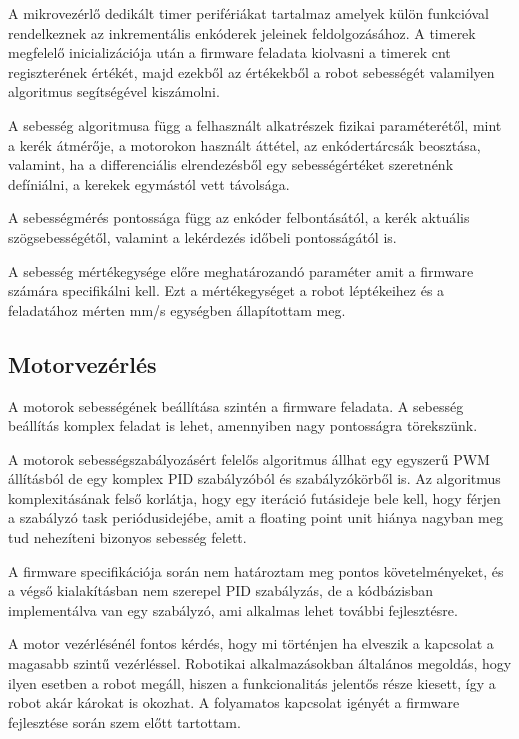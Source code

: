 A mikrovezérlő dedikált timer perifériákat tartalmaz amelyek külön funkcióval
rendelkeznek az inkrementális enkóderek jeleinek feldolgozásához. A timerek
megfelelő inicializációja után a firmware feladata kiolvasni a timerek cnt
regiszterének értékét, majd ezekből az értékekből a robot sebességét valamilyen
algoritmus segítségével kiszámolni.

A sebesség algoritmusa függ a felhasznált alkatrészek fizikai paraméterétől, mint
a kerék átmérője, a motorokon használt áttétel, az enkódertárcsák beosztása,
valamint, ha a differenciális elrendezésből egy sebességértéket szeretnénk
defíniálni, a kerekek egymástól vett távolsága.

A sebességmérés pontossága függ az enkóder felbontásától, a kerék aktuális
szögsebességétől, valamint a lekérdezés időbeli pontosságától is.

A sebesség mértékegysége előre meghatározandó paraméter amit a firmware számára
specifikálni kell. Ezt a mértékegységet a robot léptékeihez és a feladatához
mérten mm/s egységben állapítottam meg.

\subsection{Motorvezérlés}

A motorok sebességének beállítása szintén a firmware feladata. A sebesség
beállítás komplex feladat is lehet, amennyiben nagy pontosságra törekszünk.

A motorok sebességszabályozásért felelős algoritmus állhat egy egyszerű PWM
állításból de egy komplex PID szabályzóból és szabályzókörből is. Az algoritmus
komplexitásának felső korlátja, hogy egy iteráció futásideje bele kell, hogy
férjen a szabályzó task periódusidejébe, amit a floating point unit hiánya
nagyban meg tud nehezíteni bizonyos sebesség felett.

A firmware specifikációja során nem határoztam meg pontos követelményeket, és a
végső kialakításban nem szerepel PID szabályzás, de a kódbázisban implementálva
van egy szabályzó, ami alkalmas lehet további fejlesztésre.

\medskip

A motor vezérlésénél fontos kérdés, hogy mi történjen ha elveszik a kapcsolat a
magasabb szintű vezérléssel. Robotikai alkalmazásokban általános megoldás, hogy
ilyen esetben a robot megáll, hiszen a funkcionalitás jelentős része kiesett, így
a robot akár károkat is okozhat. A folyamatos kapcsolat igényét a firmware
fejlesztése során szem előtt tartottam.

